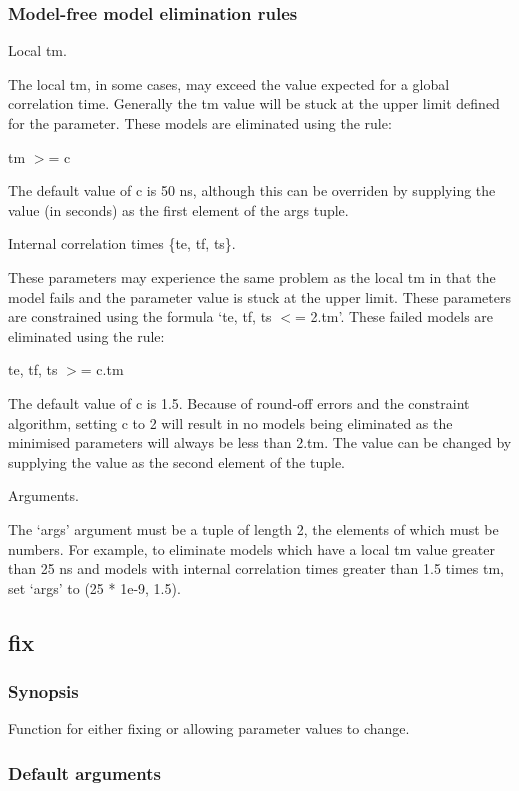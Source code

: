 \subsubsection{Model-free model elimination rules}

Local tm.

The local tm, in some cases, may exceed the value expected for a global correlation time.
Generally the tm value will be stuck at the upper limit defined for the parameter.  These
models are eliminated using the rule:

    tm $>$= c

The default value of c is 50 ns, although this can be overriden by supplying the value (in
seconds) as the first element of the args tuple.


Internal correlation times \{te, tf, ts\}.

These parameters may experience the same problem as the local tm in that the model fails and
the parameter value is stuck at the upper limit.  These parameters are constrained using the
formula `te, tf, ts $<$= 2.tm'.  These failed models are eliminated using the rule:

    te, tf, ts $>$= c.tm

The default value of c is 1.5.  Because of round-off errors and the constraint algorithm,
setting c to 2 will result in no models being eliminated as the minimised parameters will
always be less than 2.tm.  The value can be changed by supplying the value as the second
element of the tuple.


Arguments.

The `args' argument must be a tuple of length 2, the elements of which must be numbers.  For
example, to eliminate models which have a local tm value greater than 25 ns and models with
internal correlation times greater than 1.5 times tm, set `args' to (25 * 1e-9, 1.5).


\newpage

\subsection{fix}


\subsubsection{Synopsis}

Function for either fixing or allowing parameter values to change.

\subsubsection{Default arguments}

